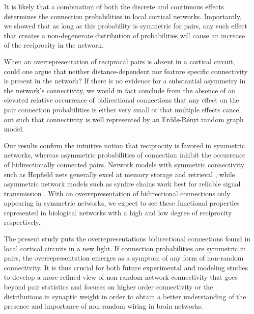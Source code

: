 It is likely that a combination of both the discrete and continuous effects determines the connection probabilities in local cortical networks.
%
Importantly, we showed that as long as this probability is symmetric for pairs, any such effect that creates a non-degenerate distribution of probabilities will cause an increase of the reciprocity in the network.

When an overrepresentation of reciprocal pairs is absent in a cortical circuit, could one argue that neither distance-dependent nor feature specific connectivity is present in the network?
%
If there is no evidence for a substantial asymmetry in the network's connectivity, we would in fact conclude from the absence of an elevated relative occurrence of bidirectional connections that any effect on the pair connection probabilities is either very small or that multiple effects cancel out such that connectivity is well represented by an Erd\H{o}s-R\'{e}nyi random graph model.
%

Our results confirm the intuitive notion that reciprocity is favored in symmetric networks, whereas asymmetric probabilities of connection inhibit the occurrence of bidirectionally connected pairs. Network models with symmetric connectivity such as Hopfield nets generally excel at memory storage and retrieval \cite{Hopfield1982}, while asymmetric network models such as synfire chains work best for reliable signal transmission \cite{Abeles1982}. With an overrepresentation of bidirectional connections only appearing in symmetric networks, we expect to see these functional properties represented in biological networks with a high and low degree of reciprocity respectively.

The present study puts the overrepresentations bidirectional connections found in local cortical circuits in a new light.
%
If connection probabilities are symmetric in pairs, the overrepresentation emerges as a symptom of any form of non-random connectivity.
%
It is thus crucial for both future experimental and modeling studies to develop a more refined view of non-random network connectivity that goes beyond pair statistics and focuses on higher order connectivity or the distributions in synaptic weight in order to obtain a better understanding of the presence and importance of non-random wiring in brain networks.
